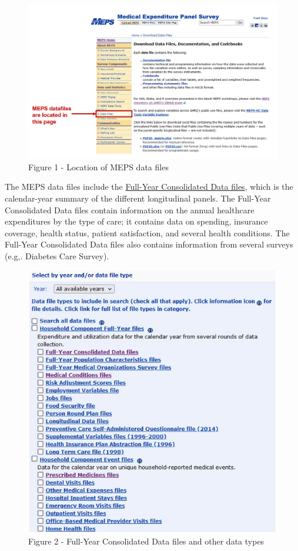 \documentclass[
]{book}
\theoremstyle{definition}
\theoremstyle{definition}
\theoremstyle{definition}
\theoremstyle{definition}
\theoremstyle{remark}
\begin{document}
\begin{figure}
\includegraphics[width=1\linewidth]{Figure 1} \caption{Figure 1 - Location of MEPS data files}\label{fig:unnamed-chunk-2}
\end{figure}

The MEPS data files include the \href{https://www.meps.ahrq.gov/mepsweb/data_stats/download_data_files_detail.jsp?cboPufNumber=HC-224}{Full-Year Consolidated Data files}, which is the calendar-year summary of the different longitudinal panels. The Full-Year Consolidated Data files contain information on the annual healthcare expenditures by the type of care; it contains data on spending, insurance coverage, health status, patient satisfaction, and several health conditions. The Full-Year Consolidated Data files also contains information from several surveys (e.g,. Diabetes Care Survey).

\begin{figure}
\includegraphics[width=1\linewidth]{Figure 2} \caption{Figure 2 - Full-Year Consolidated Data files and other data types}\label{fig:unnamed-chunk-3}
\end{figure}
\end{document}
